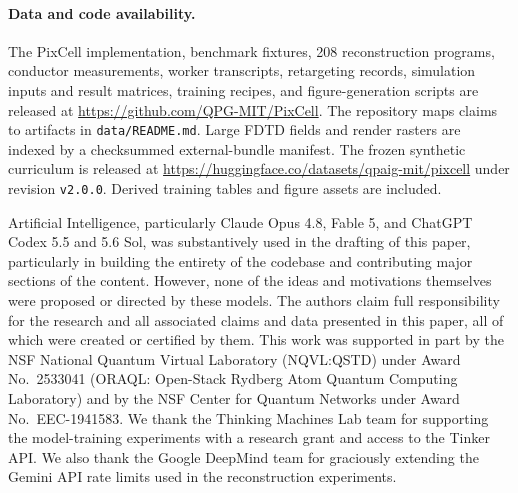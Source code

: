 \documentclass[%
 reprint,
 superscriptaddress,
 amsmath,amssymb,
 aps,
 pra,
 longbibliography,
 floatfix,
]{revtex4-2}
\begin{document}
\paragraph*{Data and code availability.} The PixCell implementation,
benchmark fixtures, 208 reconstruction programs, conductor measurements,
worker transcripts, retargeting records, simulation inputs and result
matrices, training recipes, and figure-generation scripts are released at
\url{https://github.com/QPG-MIT/PixCell}. The repository maps claims to
artifacts in \texttt{data/README.md}. Large FDTD fields and render rasters
are indexed by a checksummed external-bundle manifest. The frozen synthetic
curriculum is released at
\url{https://huggingface.co/datasets/qpaig-mit/pixcell} under revision
\texttt{v2.0.0}. Derived training tables and figure assets are included.

\begin{acknowledgments}
Artificial Intelligence, particularly Claude Opus 4.8, Fable 5, and ChatGPT
Codex 5.5 and 5.6 Sol, was substantively used in the drafting of this paper,
particularly in building the entirety of the codebase and contributing major
sections of the content. However, none of the ideas and motivations themselves
were proposed or directed by these models. The authors claim full
responsibility for the research and all associated claims and data presented
in this paper, all of which were created or certified by them.
This work was supported in part by the NSF National Quantum Virtual Laboratory
(NQVL:QSTD) under Award No.~\mbox{2533041} (ORAQL: Open-Stack Rydberg Atom Quantum
Computing Laboratory) and by the NSF Center for Quantum Networks under Award
No.~\mbox{EEC-1941583}.
We thank the Thinking Machines Lab team for supporting the model-training
experiments with a research grant and access to the Tinker API. We also thank
the Google DeepMind team for graciously extending the Gemini API rate limits
used in the reconstruction experiments.
\end{acknowledgments}



\end{document}
